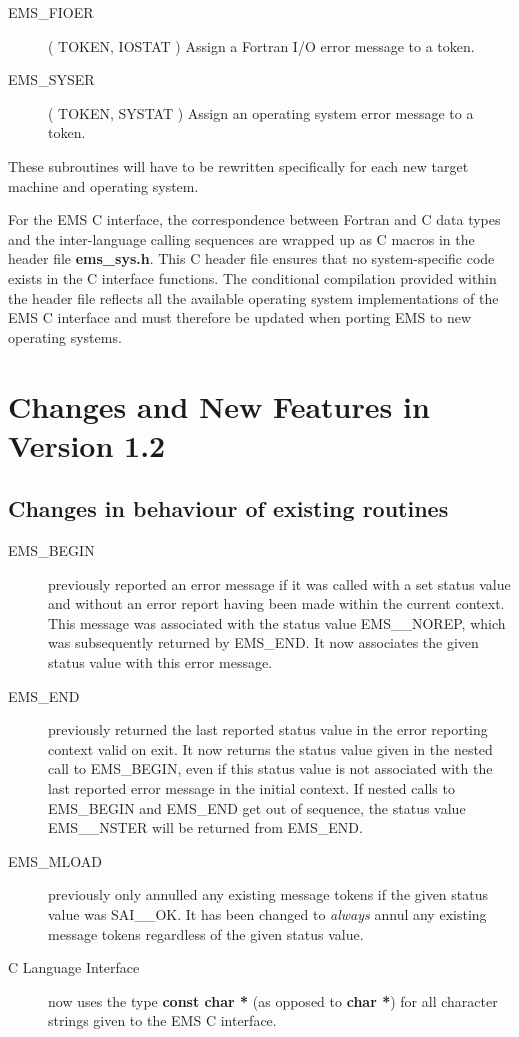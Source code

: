 \begin {description}
\item [EMS\_FIOER] ( TOKEN, IOSTAT ) 
\subitem Assign a Fortran I/O error message to a token.
\indexspace
\item [EMS\_SYSER] ( TOKEN, SYSTAT ) 
\subitem Assign an operating system error message to a token.
\end {description}

These subroutines will have to be rewritten specifically for each new target
machine and operating system.

For the EMS C interface, the correspondence between Fortran and C
data types and the inter-language calling sequences are wrapped up as C
macros in the header file {\bf ems\_sys.h}.
This C header file ensures that no system-specific code exists in the C
interface functions.
The conditional compilation provided within the 
header file reflects all the available operating system implementations 
of the EMS C interface and must therefore be updated when porting EMS to 
new operating systems.

\section {Changes and New Features in Version 1.2}

\subsection {Changes in behaviour of existing routines}

\begin {description}
\item [EMS\_BEGIN] previously reported an error message if it was called
with a set status value and without an error report having been 
made within the current context. 
This message was associated  with the status value EMS\_\_NOREP, which was
subsequently returned by EMS\_END. 
It now associates the given status value  with this error message.
\item [EMS\_END] previously returned the last reported status value in the
error reporting context valid on exit.
It now returns the status value given in the nested call to EMS\_BEGIN, even
if this status value is not associated with the last reported error
message in the initial context.
If nested calls to EMS\_BEGIN and EMS\_END get out of sequence, the status
value EMS\_\_NSTER will be returned from EMS\_END.
\item [EMS\_MLOAD] previously only annulled any existing message tokens if the
given status value was SAI\_\_OK. 
It has been changed to {\em always} annul  any existing message tokens
regardless of the given status value.
\item [C Language Interface] now uses the type {\bf const char *} (as 
opposed to {\bf char *}) for all 
character strings given to the EMS C interface.
\end {description}


